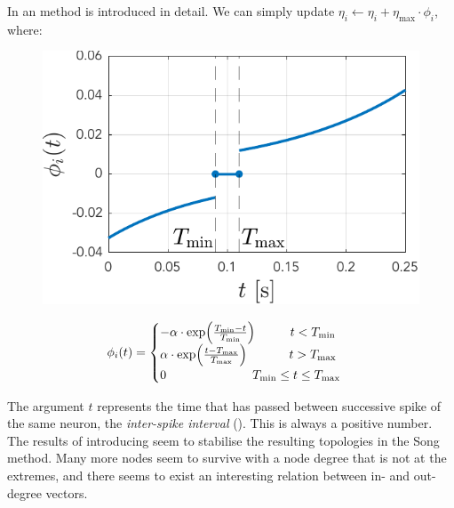 In \cite{Song2017} an \IP method is introduced in detail. We can simply update $\eta_{i} \leftarrow \eta_{i} + \eta_{\max } \cdot \phi_{i}$, where: 
\begin{minipage}{.45\textwidth}
   \centering
   \begin{figure}[H]
	\centering
	\includegraphics[width = \textwidth]{../Figures/Learning/IPlearningFunction.pdf}
	\label{fig:IPlearningFunction}
	\end{figure}
\end{minipage}
\begin{minipage}{.55\textwidth}
\begin{align}
	\phi_{i} (t) =
	\begin{cases}
	-\alpha \cdot \exp \left(\frac{T_{\min }-t}{T_{\rm min }}\right) \hspace{10mm} t<T_{ \rm min } \\ 
	\alpha \cdot \exp \left(\frac{t-T_{\rm max }}{T_{\max }}\right) \hspace{12mm} t >T_{\rm max } \\ 
	0 \hspace{24.5mm} T_{ \rm min } \leq t \leq T_{\rm max }
	\end{cases}
\end{align}
\vspace{10mm}
\end{minipage}
The argument $t$ represents the time that has passed between successive spike of the same neuron, the \textsl{inter-spike interval} (\ISI). This is always a positive number. \\

The results of introducing \IP seem to stabilise the resulting topologies in the Song method. Many more nodes seem to survive with a node degree that is not at the extremes, and there seems to exist an interesting relation between in- and out-degree vectors.



